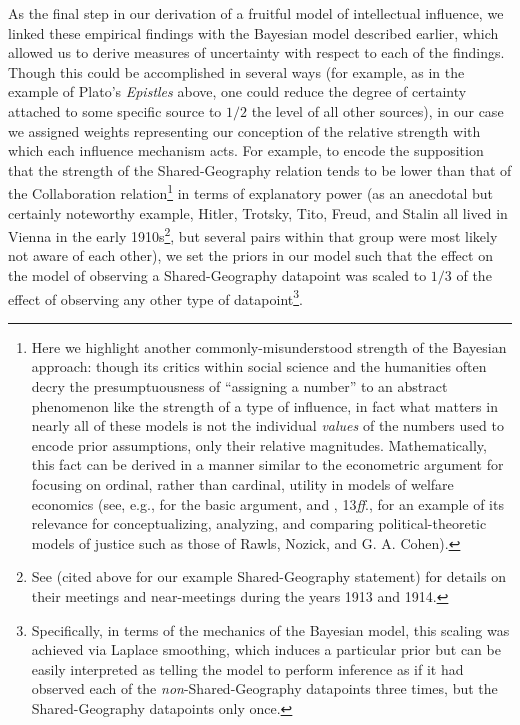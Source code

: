 \documentclass[11pt]{article}
\begin{document}
As the final step in our derivation of a fruitful model of intellectual influence, we linked these empirical findings with the Bayesian model described earlier, which allowed us to derive measures of uncertainty with respect to each of the findings. Though this could be accomplished in several ways (for example, as in the example of Plato's \textit{Epistles} above, one could reduce the degree of certainty attached to some specific source to $1/2$ the level of all other sources), in our case we assigned weights representing our conception of the relative strength with which each influence mechanism acts.
For example, to encode the supposition that the strength of the \textsf{Shared-Geography} relation tends to be lower than that of the \textsf{Collaboration} relation\footnote{Here we highlight another commonly-misunderstood strength of the Bayesian approach: though its critics within social science and the humanities often decry the presumptuousness of ``assigning a number'' to an abstract phenomenon like the strength of a type of influence, in fact what matters in nearly all of these models is not the individual \textit{values} of the numbers used to encode prior assumptions, only their relative magnitudes. Mathematically, this fact can be derived in a manner similar to the econometric argument for focusing on ordinal, rather than cardinal, utility in models of welfare economics (see, e.g., \cite{harsanyi_cardinal_1953} for the basic argument, and \cite{roemer_theories_1996}, 13\textit{ff}., for an example of its relevance for conceptualizing, analyzing, and comparing political-theoretic models of justice such as those of Rawls, Nozick, and G. A. Cohen).} 
in terms of explanatory power (as an anecdotal but certainly noteworthy example, Hitler, Trotsky, Tito, Freud, and Stalin all lived in Vienna in the early 1910s\footnote{See \cite{morton_thunder_1990} (cited above for our example \textsf{Shared-Geography} statement) for details on their meetings and near-meetings during the years 1913 and 1914.}, but several pairs within that group were most likely not aware of each other), we set the priors in our model such that the effect on the model of observing a \textsf{Shared-Geography} datapoint was scaled to $1/3$ of the effect of observing any other type of datapoint\footnote{Specifically, in terms of the mechanics of the Bayesian model, this scaling was achieved via Laplace smoothing, which induces a particular prior but can be easily interpreted as telling the model to perform inference as if it had observed each of the \textit{non}-\textsf{Shared-Geography} datapoints three times, but the \textsf{Shared-Geography} datapoints only once.}.
\end{document}
